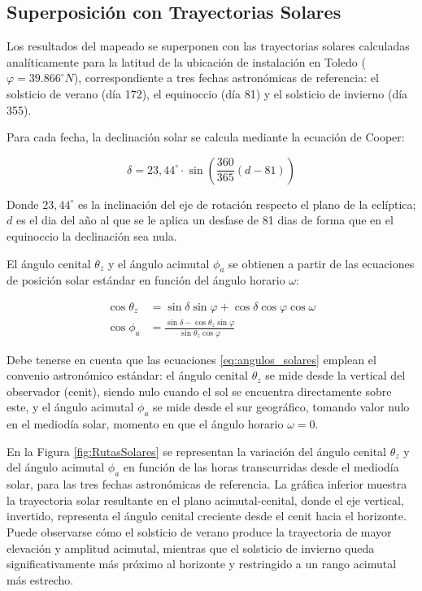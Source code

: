 \subsection{Superposición con Trayectorias Solares}

Los resultados del mapeado se superponen con las trayectorias solares calculadas analíticamente para la latitud de la ubicación de instalación en Toledo ($\varphi=39.866^{\circ} N$), correspondiente a tres fechas astronómicas de referencia: el solsticio de verano (día 172), el equinoccio (día 81) y el solsticio de invierno (día 355).

Para cada fecha, la declinación solar se calcula mediante la ecuación de Cooper:

\begin{equation}
	\delta=23{,}44^{\circ}\cdot \sin{\left(\frac{360}{365}(d-81)\right)}
	\label{eq:eqCooper}
\end{equation}

Donde $23{,}44^{\circ}$ es la inclinación del eje de rotación respecto el plano de la eclíptica; $d$ es el dia del año al que se le aplica un desfase de 81 dias de forma que en el equinoccio la declinación sea nula.

El ángulo cenital $\theta_z$ y el ángulo acimutal $\phi_a$ se obtienen a partir de las ecuaciones de posición solar estándar en función del ángulo horario $\omega$:

\begin{equation}
    \begin{aligned}
        \cos\theta_z &= \sin\delta\sin\varphi+\cos\delta\cos\varphi\cos\omega \\[1ex]
        \cos\phi_a &= \frac{\sin\delta-\cos\theta_z\sin\varphi}{\sin\theta_z\cos\varphi}
    \end{aligned}
    \label{eq:angulos_solares}
\end{equation}

Debe tenerse en cuenta que las ecuaciones \eqref{eq:angulos_solares} emplean el convenio astronómico estándar: el ángulo cenital $\theta_z$ se mide desde la vertical del observador (cenit), siendo nulo cuando el sol se encuentra directamente sobre este, y el ángulo acimutal $\phi_a$ se mide desde el sur geográfico, tomando valor nulo en el mediodía solar, momento en que el ángulo horario $\omega=0$.

En la Figura \ref{fig:RutasSolares} se representan la variación del ángulo cenital $\theta_z$ y del ángulo acimutal $\phi_a$ en función de las horas transcurridas desde el mediodía solar, para las tres fechas astronómicas de referencia. La gráfica inferior muestra la trayectoria solar resultante en el plano acimutal-cenital, donde el eje vertical, invertido, representa el ángulo cenital creciente desde el cenit hacia el horizonte. Puede observarse cómo el solsticio de verano produce la trayectoria de mayor elevación y amplitud acimutal, mientras que el solsticio de invierno queda significativamente más próximo al horizonte y restringido a un rango acimutal más estrecho.

